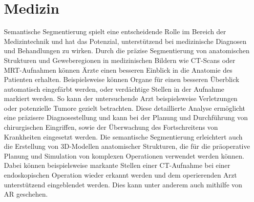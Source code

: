 \section{Medizin}
Semantische Segmentierung spielt eine entscheidende Rolle im Bereich der
Medizintechnik und hat das Potenzial, unterstützend bei medizinische Diagnosen
und Behandlungen zu wirken. Durch die präzise Segmentierung von anatomischen
Strukturen und Geweberegionen in medizinischen Bildern wie CT-Scans oder
MRT-Aufnahmen können Ärzte einen besseren Einblick in die Anatomie des
Patienten erhalten. Beispielsweise können Organe für einen besseren Überblick
automatisch eingefärbt werden, oder verdächtige Stellen in der Aufnahme
markiert werden. So kann der untersuchende Arzt beispielsweise Verletzungen
oder potenzielle Tumore gezielt betrachten. Diese detaillierte Analyse
ermöglicht eine präzisere Diagnosestellung und kann bei der Planung und
Durchführung von chirurgischen Eingriffen, sowie der Überwachung des
Fortschreitens von Krankheiten eingesetzt werden. Die semantische Segmentierung
erleichtert auch die Erstellung von 3D-Modellen anatomischer Strukturen, die
für die präoperative Planung und Simulation von komplexen Operationen verwendet
werden können. Dabei können beispielsweise markante Stellen einer CT-Aufnahme
bei einer endoskopischen Operation wieder erkannt werden und dem operierenden
Arzt unterstützend eingeblendet werden. Dies kann unter anderem auch mithilfe
von AR geschehen. \cite{asgari2021deep,tanzi2021real}